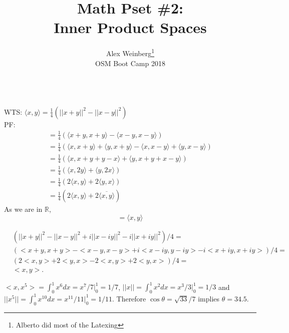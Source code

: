 \documentclass[letterpaper,12pt]{article}
\theoremstyle{definition}
\newenvironment{problem}[2][Problem]{\begin{trivlist}
\item[\hskip \labelsep {\bfseries #1}\hskip \labelsep {\bfseries #2.}]}{\end{trivlist}}
\newcommand\inner[2]{\langle #1, #2 \rangle}
\begin{document}
\title{Math Pset \#2:\\
Inner Product Spaces}
\author{Alex Weinberg\footnote{Alberto did most of the Latexing}\\
OSM Boot Camp 2018} %

\maketitle

\vspace{5mm}

\begin{problem}1 ~\\
WTS: $\inner{x}{y} = \frac{1}{4}(||x+y||^2 - ||x-y||^2)$ \\
PF:
\begin{gather*}
= \frac{1}{4}(\inner{x+y}{x+y} - \inner{x-y}{x-y}) \\
= \frac{1}{4}(\inner{x}{x+y} + \inner{y}{x+y} -  \inner{x}{x-y} +  \inner{y}{x-y}) \\
= \frac{1}{4}(\inner{x}{x+y+y-x} + \inner{y}{x+y+x-y}) \\
= \frac{1}{4}(\inner{x}{2y} + \inner{y}{2x}) \\
= \frac{1}{4}(2\inner{x}{y} + 2\inner{y}{x}) \\
= \frac{1}{4}(2\inner{x}{y} + 2\overline{\inner{x}{y}})
\end{gather*}
As we are in $\mathbb{R}$, $$= \inner{x}{y}$$
\end{problem}

\begin{problem}2
\begin{align*}
    &(||x+y||^2 - ||x-y||^2 + i||x-iy||^2 - i||x+iy||^2) / 4 =\\
    &(<x+y,x+y> - <x-y,x-y> + i<x-iy,y-iy> - i<x+iy,x+iy>) / 4 =\\
    &(2<x,y> + 2<y,x> -2<x,y> +2<y,x>) / 4=\\
    &<x,y>.
\end{align*}
\end{problem}


\begin{problem}3
$<x,x^5> = \int_0^1x^6dx=x^7/7|_0^1=1/7$,
$||x|| = \int_0^1x^2dx=x^3/3|_0^1=1/3$ and
$||x^5|| = \int_0^1x^10dx=x^11/11|_0^1=1/11$.
Therefore $\cos\theta=\sqrt{33}/7$ implies $\theta=34.5$.
\end{problem}
\end{document}
